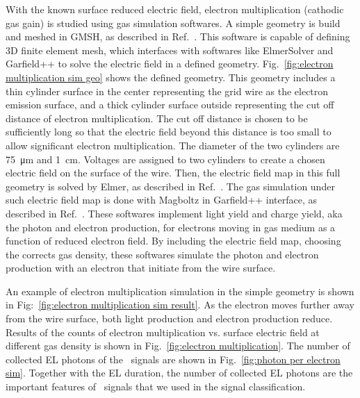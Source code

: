 With the known surface reduced electric field, electron multiplication (cathodic gas gain) is studied using gas simulation softwares. A simple geometry is build and meshed in GMSH, as described in Ref.~\cite{Geuzaine2009}.  This software is capable of defining 3D finite element mesh, which interfaces with softwares like ElmerSolver and Garfield++ to solve the electric field in a defined geometry. Fig.~\ref{fig:electron multiplication sim geo} shows the defined geometry. This geometry includes a thin cylinder surface in the center representing the grid wire as the electron emission surface, and a thick cylinder surface outside representing the cut off distance of electron multiplication. The cut off distance is chosen to be sufficiently long so that the electric field beyond this distance is too small to allow significant electron multiplication. The diameter of the two cylinders are \SI{75}{\um} and \SI{1}{\cm}. Voltages are assigned to two cylinders to create a chosen electric field on the surface of the wire. Then, the electric field map in this full geometry is solved by Elmer, as described in Ref.~\cite{Elmergrid2000, Kotila1999}.  The gas simulation under such electric field map is done with Magboltz in Garfield++ interface, as described in Ref.~\cite{Biagi1999, Veenhof1998}. These softwares implement light yield and charge yield, aka the photon and electron production, for electrons moving in gas medium as a function of reduced electron field. By including the electric field map, choosing the corrects gas density, these softwares simulate the photon and electron production with an electron that initiate from the wire surface. 

An example of electron multiplication simulation in the simple geometry is shown in Fig:~\ref{fig:electron multiplication sim result}. As the electron moves further away from the wire surface, both light production and electron production reduce. Results of the counts of electron multiplication vs. surface electric field at different gas density is shown in Fig.~\ref{fig:electron multiplication}. The number of collected EL photons of the \ees\ signals are shown in Fig.~\ref{fig:photon per electron sim}. Together with the EL duration, the number of collected EL photons are the important features of \ees\ signals that we used in the signal classification.

